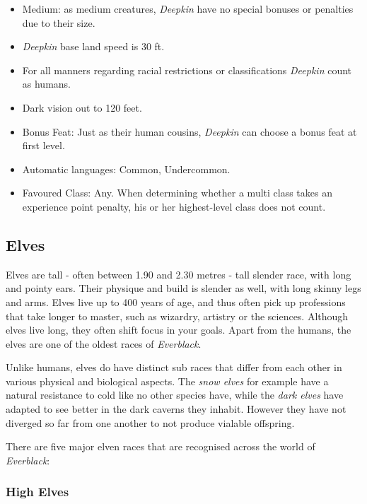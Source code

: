 \begin{35e}
  \begin{itemize}[noitemsep]
    \item Medium: as medium creatures, \emph{Deepkin} have no special bonuses or
    penalties due to their size.
    \item \emph{Deepkin} base land speed is 30 ft.
    \item For all manners regarding racial restrictions or classifications
    \emph{Deepkin} count as humans.
    \item Dark vision out to 120 feet.
    \item Bonus Feat: Just as their human cousins, \emph{Deepkin} can choose a
    bonus feat at first level.
    \item Automatic languages: Common, Undercommon.
    \item Favoured Class: Any. When determining whether a multi class takes an
    experience point penalty, his or her highest-level class does not count.
  \end{itemize}
\end{35e}

\subsection*{Elves}

Elves are tall - often between 1.90 and 2.30 metres - tall slender
race, with long and pointy ears. Their physique and build is slender
as well, with long skinny legs and arms. Elves live up to 400 years of
age, and thus often pick up professions that take longer to master, such
as wizardry, artistry or the sciences. Although elves live long, they
often shift focus in your goals. Apart from the humans, the elves are one
of the oldest races of \emph{Everblack}.

Unlike humans, elves do have distinct sub races that differ from each other
in various physical and biological aspects. The \emph{snow elves} for example
have a natural resistance to cold like no other species have, while the
\emph{dark elves} have adapted to see better in the dark caverns they
inhabit. However they have not diverged so far from one another to not
produce vialable offspring.

There are five major elven races that are recognised across the world of
\emph{Everblack}:

\subsubsection*{High Elves}

